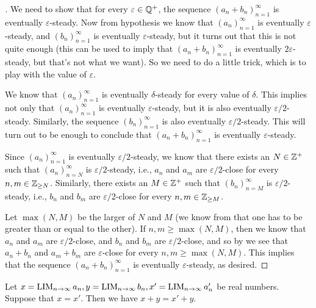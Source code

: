 \begin{proof}[]
  We need to show that for every \(\varepsilon \in \mathbb{Q}^+\), the sequence \((a_n + b_n)_{n = 1}^{\infty}\) is eventually \(\varepsilon\)-steady.
  Now from hypothesis we know that \((a_n)_{n = 1}^{\infty}\) is eventually \(\varepsilon\)-steady, and \((b_n)_{n = 1}^{\infty}\) is eventually \(\varepsilon\)-steady, but it turns out that this is not quite enough
  (this can be used to imply that \((a_n + b_n)_{n = 1}^{\infty}\) is eventually \(2\varepsilon\)-steady, but that's not what we want).
  So we need to do a little trick, which is to play with the value of \(\varepsilon\).

  We know that \((a_n)_{n = 1}^{\infty}\) is eventually \(\delta\)-steady for every value of \(\delta\).
  This implies not only that \((a_n)_{n = 1}^{\infty}\) is eventually \(\varepsilon\)-steady, but it is also eventually \(\varepsilon / 2\)-steady.
  Similarly, the sequence \((b_n)_{n = 1}^{\infty}\) is also eventually \(\varepsilon / 2\)-steady.
  This will turn out to be enough to conclude that \((a_n + b_n)_{n = 1}^{\infty}\) is eventually \(\varepsilon\)-steady.

  Since \((a_n)_{n = 1}^{\infty}\) is eventually \(\varepsilon / 2\)-steady, we know that there exists an \(N \in \mathbb{Z}^+\) such that \((a_n)_{n = N}^{\infty}\) is \(\varepsilon / 2\)-steady, i.e., \(a_n\) and \(a_m\) are \(\varepsilon / 2\)-close for every \(n, m \in \mathbb{Z}_{\geq N}\).
  Similarly, there exists an \(M \in \mathbb{Z}^+\) such that \((b_n)_{n = M}^{\infty}\) is \(\varepsilon / 2\)-steady, i.e., \(b_n\) and \(b_m\) are \(\varepsilon / 2\)-close for every \(n, m \in \mathbb{Z}_{\geq M}\).

  Let \(\max(N, M)\) be the larger of \(N\) and \(M\)
  (we know from  that one has to be greater than or equal to the other).
  If \(n, m \geq \max(N, M)\), then we know that \(a_n\) and \(a_m\) are \(\varepsilon / 2\)-close, and \(b_n\) and \(b_m\) are \(\varepsilon / 2\)-close, and so by  we see that \(a_n + b_n\) and \(a_m + b_m\) are \(\varepsilon\)-close for every \(n, m \geq \max(N, M)\).
  This implies that the sequence \((a_n + b_n)_{n = 1}^{\infty}\) is eventually \(\varepsilon\)-steady, as desired.
\end{proof}

\begin{lem}\label{i:5.3.7}
  Let \(x = \operatorname*{LIM}_{n \to \infty} a_n, y = \operatorname*{LIM}_{n \to \infty} b_n, x' = \operatorname*{LIM}_{n \to \infty} a_n'\) be real numbers.
  Suppose that \(x = x'\).
  Then we have \(x + y = x' + y\).
\end{lem}

